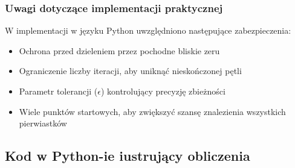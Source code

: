 \documentclass[a4paper,12pt]{article}
\begin{document}
\subsubsection{Uwagi dotyczące implementacji praktycznej}

W implementacji w języku Python uwzględniono następujące zabezpieczenia:
\begin{itemize}
    \item Ochrona przed dzieleniem przez pochodne bliskie zeru
    \item Ograniczenie liczby iteracji, aby uniknąć nieskończonej pętli
    \item Parametr tolerancji ($\epsilon$) kontrolujący precyzję zbieżności
    \item Wiele punktów startowych, aby zwiększyć szansę znalezienia wszystkich pierwiastków
\end{itemize}

\newpage

\subsection{Kod w Python-ie iustrujący obliczenia}
\end{document}
